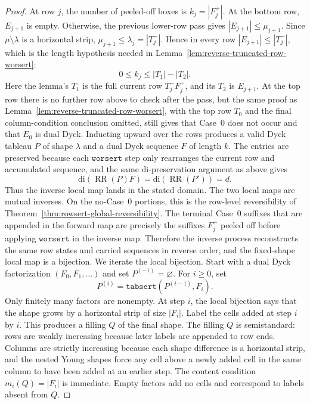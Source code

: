 \documentclass[10pt,a4paper]{amsart}
\newcommand{\di}{\mathrm{di}}
\newcommand{\worsert}{\texttt{worsert}}
\begin{document}
\begin{proof}
At row \(j\), the number of peeled-off boxes is \(k_j=|F_j^+|\).  At the bottom
row, \(E_{j+1}\) is empty.  Otherwise, the previous lower-row pass gives
\(|E_{j+1}|\le \mu_{j+1}\).  Since \(\mu\setminus\lambda\) is a horizontal
strip, \(\mu_{j+1}\le \lambda_j=|T_j^-|\).  Hence in every row
\(|E_{j+1}|\le |T_j^-|\), which is the length hypothesis needed in
Lemma~\ref{lem:reverse-truncated-row-worsert}:
\[
  0\le k_j\le |T_1|-|T_2|.
\]
Here the lemma's \(T_1\) is the full current row \(T_j^-F_j^+\), and its
\(T_2\) is \(E_{j+1}\).  At the top row there is no further row above to check
after the pass, but the same proof as
Lemma~\ref{lem:reverse-truncated-row-worsert}, with the top row \(T_0\) and the
final column-condition conclusion omitted, still gives that Case~0 does not
occur and that \(E_0\) is dual Dyck.
Inducting upward over the rows produces a valid Dyck tableau \(P\) of shape
\(\lambda\) and a dual Dyck sequence \(F\) of length \(k\).  The entries are
preserved because each \(\worsert\) step only rearranges the current row and
accumulated sequence, and the same \(\di\)-preservation argument as above gives
\[
  \di(\operatorname{RR}(P)F)=\di(\operatorname{RR}(P'))=d.
\]
Thus the inverse local map lands in the stated domain.
The two local maps are mutual inverses.  On the no-Case~0 portions, this is the
row-level reversibility of Theorem~\ref{thm:rowsert-global-reversibility}.  The
terminal Case~0 suffixes
that are appended in the forward map are precisely the suffixes \(F_j^+\) peeled
off before applying \(\worsert\) in the inverse map.  Therefore the inverse
process reconstructs the same row states and carried sequences in reverse
order, and the fixed-shape local map is a bijection.
We iterate the local bijection.  Start with a dual Dyck factorization
\((F_0,F_1,\ldots)\) and set \(P^{(-1)}=\varnothing\).  For \(i\ge 0\), set
\[
  P^{(i)}=\texttt{tabsert}(P^{(i-1)},F_i).
\]
Only finitely many factors are nonempty.  At step \(i\), the local bijection
says that the shape grows by a horizontal strip of size \(|F_i|\).  Label the
cells added at step \(i\) by \(i\).  This produces a filling \(Q\) of the final
shape.  The filling \(Q\) is semistandard: rows are weakly increasing because
later labels are appended to row ends.  Columns are strictly increasing because
each shape difference is a horizontal strip, and the nested Young shapes force
any cell above a newly added cell in the same column to have been added at an
earlier step.  The content condition \(m_i(Q)=|F_i|\) is immediate.  Empty
factors add no cells and correspond to labels absent from \(Q\).

\end{proof}
\end{document}

